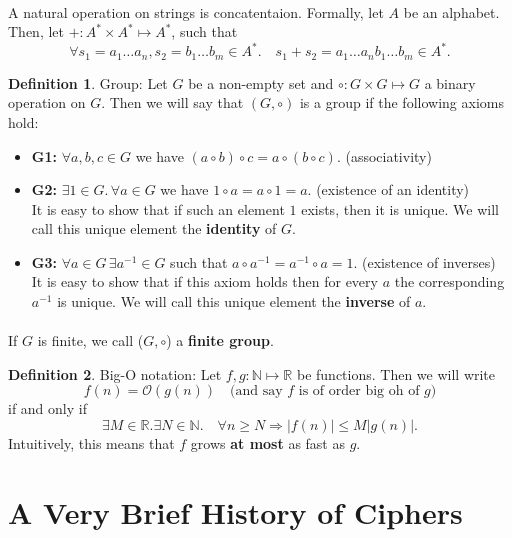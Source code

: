 \documentclass{article}
\theoremstyle{definition}
\newtheorem{definition}{Definition}[section]
\newcommand{\Oh}{\mathcal{O}}
\newcommand{\Nat}{\mathbb{N}}
\newcommand{\Reals}{\mathbb{R}}
\begin{document}
\paragraph{}
A natural operation on strings is concatentaion. Formally, let $A$ be an
alphabet. Then, let $+ : A^* \times A^* \mapsto A^*$, such that
\[
  \forall s_1 = a_1\hdots a_n, s_2 = b_1 \hdots b_m \in A^*.\quad s_1 + s_2 =
  a_1\hdots a_nb_1 \hdots b_m \in A^*.
\]
\begin{definition}{Group:}
  Let $G$ be a non-empty set and $\circ: G \times G \mapsto G$ a binary operation on $G$.
  Then we will say that $(G, \circ)$ is a group if the following axioms hold:
  \begin{itemize}
  \item \textbf{G1:} $\forall a, b, c \in G$ we have $(a \circ b) \circ c = a
    \circ (b \circ c)$. (associativity)
  \item \textbf{G2:} $\exists 1 \in G. \,\forall a \in G$ we have $1 \circ a = a \circ 1 = a.$ (existence of an identity)
    \\
    It is easy to show that if such an element $1$ exists, then it
    is unique. We will call this unique element the \textbf{identity} of $G$.
    
  \item \textbf{G3:} $\forall a \in G\, \exists a^{-1} \in G$ such that $a \circ
    a^{-1} = a ^{-1} \circ a = 1$. (existence of inverses)
    \\
    It is easy to show that if this axiom holds
    then for every $a$ the corresponding $a^{-1}$ is unique. We will call this
    unique element the \textbf{inverse} of $a$. 
  \end{itemize}
\end{definition}
\paragraph{} If $G$ is finite, we call ($G, \circ$) a \textbf{finite group}.
\begin{definition}{Big-O notation:} Let $f, g: \Nat \mapsto \Reals $ be
  functions. Then we will write
  \[
    f(n) = \Oh(g(n)) \quad \text{(and say $f$ is of order big oh of $g$)}
  \]
  if and only if
  \[
    \exists M \in \Reals. \exists N \in \Nat.\quad \forall n \geq N \Rightarrow
    |f(n)| \leq M|g(n)|.
  \]
  Intuitively, this means that $f$ grows \textbf{at most} as fast as $g$.
\end{definition}
\section{A Very Brief History of Ciphers}
\end{document}
